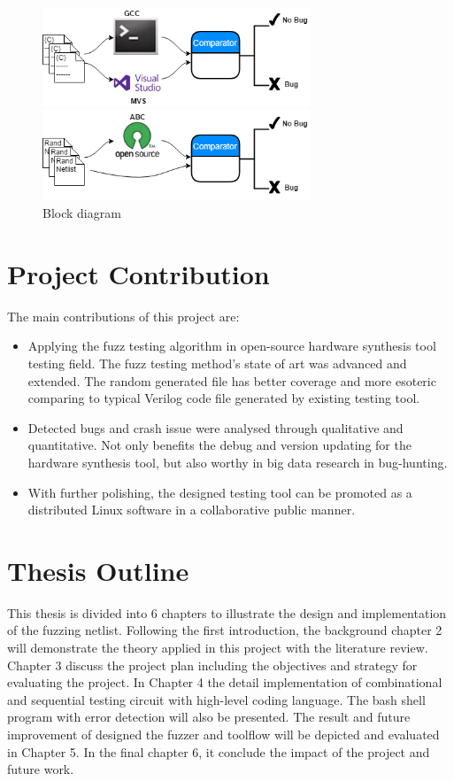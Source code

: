 \begin{figure}[htb]
\centering
\begin{minipage}[htb]{1\textwidth}
\centering
\includegraphics[width=8cm]{MScThesisTemplate/Figs/1.png}
\end{minipage}
\begin{minipage}[htb]{1\textwidth}
\centering
\includegraphics[width=8cm]{MScThesisTemplate/Figs/2.png}
\end{minipage}
\caption{Block diagram}
\label{Fig:Block diagram}
\end{figure}

\section{Project Contribution}
The main contributions of this project are:
\begin{itemize}
    \item Applying the fuzz testing algorithm in open-source hardware synthesis tool testing field. The fuzz testing method's state of art was advanced and extended. The random generated file has better coverage and more esoteric comparing to typical Verilog code file generated by existing testing tool.
    \item Detected bugs and crash issue were analysed through qualitative and quantitative. Not only benefits the debug and version updating for the hardware synthesis tool, but also worthy in big data research in bug-hunting. 
    \item With further polishing, the designed testing tool can be promoted as a distributed Linux software in a collaborative public manner.
\end{itemize}

\section{Thesis Outline}
This thesis is divided into 6 chapters to illustrate the design and implementation of the fuzzing netlist. Following the first introduction, the background chapter 2 will demonstrate the theory applied in this project with the literature review. Chapter 3 discuss the project plan including the objectives and strategy for evaluating the project. In Chapter 4 the detail implementation of combinational and sequential testing circuit with high-level coding language. The bash shell program with error detection will also be presented. The result and future improvement of designed the fuzzer and toolflow will be depicted and evaluated in Chapter 5. In the final chapter 6, it conclude the impact of the project and future work. 